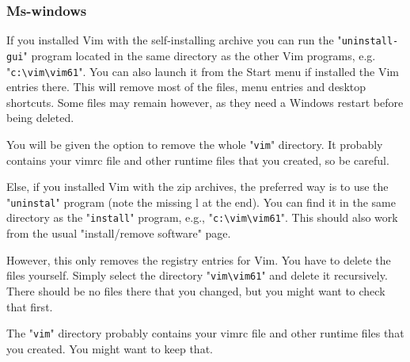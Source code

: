 \subsubsection{Ms-windows}
If you installed Vim with the self-installing archive you can run the "\verb!uninstall-gui!" program located in the same directory as the other Vim programs, e.g. "\verb!c:\vim\vim61!".
You can also launch it from the Start menu if installed the Vim entries there.
This will remove most of the files, menu entries and desktop shortcuts.
Some files may remain however, as they need a Windows restart before being deleted.

You will be given the option to remove the whole "\verb!vim!" directory.
It probably contains your vimrc file and other runtime files that you created, so be careful.

Else, if you installed Vim with the zip archives, the preferred way is to use the "\verb!uninstal!" program (note the missing l at the end).
You can find it in the same directory as the "\verb!install!" program, e.g., "\verb!c:\vim\vim61!".
This should also work from the usual "install/remove software" page.

However, this only removes the registry entries for Vim.
You have to delete the files yourself.
Simply select the directory "\verb!vim\vim61!" and delete it recursively.
There should be no files there that you changed, but you might want to check that first.

The "\verb!vim!" directory probably contains your vimrc file and other runtime files that you created.
You might want to keep that.
\clearpage
